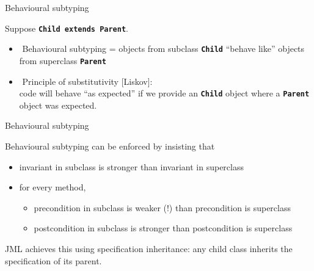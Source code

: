 \documentclass[
pdf,
nocolorBG,
slideColor,
erik,
]{prosper}
\newcommand{\code}[1]{{\rm \texttt{\textbf{\small #1}}}}
\begin{document}
\begin{slide}{Behavioural subtyping}
\vspace*{-3ex}

Suppose \code{Child extends Parent}.

\begin{itemize}
\item $\!$ {\green Behavioural subtyping} =
objects from subclass \code{Child} ``behave like'' 
objects from superclass \code{Parent}
\item $\!$ {\green Principle of substitutivity} [Liskov]:\\
code will behave ``as expected'' if we provide an
\code{Child} object where a \code{Parent} object was expected. 
\end{itemize}

\end{slide}

\begin{slide}{Behavioural subtyping}
\vspace*{-3ex}

Behavioural subtyping can be enforced by insisting that

\begin{itemize}
\item 
invariant in subclass is {\green stronger} than invariant in superclass
\item
for every method,
\begin{itemize}
\item 
precondition in subclass is {\blue weaker} (!) than precondition is superclass
\item 
postcondition in subclass is {\green stronger} than postcondition is superclass
\end{itemize}
\end{itemize}

JML achieves this using {\green specification inheritance}:
any child class {\green inherits} the specification of its parent.

\end{slide}

\end{document}
